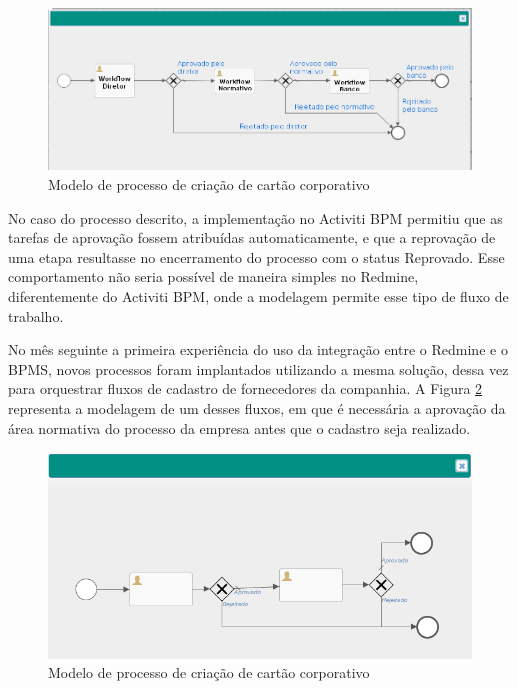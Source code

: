 \begin{figure}[H]
\centering
\includegraphics[width=1\textwidth]{imagens/process_criacao_cartao_corporativo.png}
\caption{Modelo de processo de criação de cartão corporativo}
\label{fig:process_cartao_compras}
\end{figure}

No caso do processo descrito, a implementação no Activiti BPM permitiu que as tarefas de aprovação fossem atribuídas automaticamente, e que a reprovação de uma etapa resultasse no encerramento do processo com o status Reprovado. Esse comportamento não seria possível de maneira simples no Redmine, diferentemente do Activiti BPM, onde a modelagem permite esse tipo de fluxo de trabalho.

No mês seguinte a primeira experiência do uso da integração entre o Redmine e o BPMS, novos processos foram implantados utilizando a mesma solução, dessa vez para orquestrar fluxos de cadastro de fornecedores da companhia. A Figura \ref{fig:processo_cadastro_fornecedores} representa a modelagem de um desses fluxos, em que é necessária a aprovação da área normativa do processo da empresa antes que o cadastro seja realizado.

\begin{figure}[H]
\centering
\includegraphics[width=1\textwidth]{imagens/processo_cadastro_fornecedores.png}
\caption{Modelo de processo de criação de cartão corporativo}
\label{fig:processo_cadastro_fornecedores}
\end{figure}

